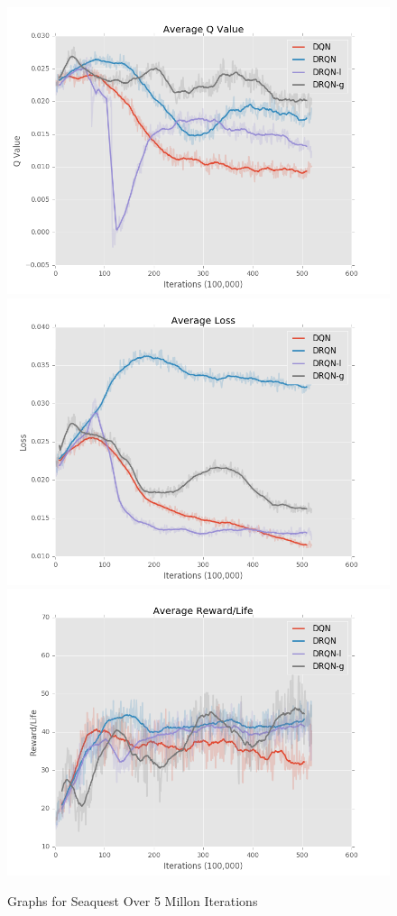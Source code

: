 \documentclass{article}
\begin{document}
\begin{figure}[h]
    \centering
    \begin{minipage}{1.0\textwidth}
        \centering
        \includegraphics[scale=0.2]{Seaquest1}
        \centering
        \includegraphics[scale=0.2]{Seaquest2}
        \centering
        \includegraphics[scale=0.2]{Seaquest3}
    \end{minipage}
    \caption{Graphs for Seaquest Over 5 Millon Iterations}
\end{figure}
\end{document}
